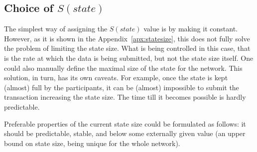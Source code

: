 \documentclass[]{llncs}   %
\begin{document}
\subsection{Choice of $S(state)$}

The simplest way of assigning the $S(state)$ value is by making it constant.
However, as it is shown in the Appendix~\ref{apx:statesize}, this does not fully solve
the problem of limiting the state size. What is being controlled in this case,
that is the rate at which the data is being submitted, but not the state size
itself. One could also manually define the maximal size of the state for the
network. This solution, in turn, has its own caveats. For example, once the
state is kept (almost) full by the participants, it can be (almost) impossible
to submit the transaction increasing the state size.  The time till it becomes
possible is hardly predictable. 

Preferable properties of the current state size could be formulated as follows:
it should be predictable, stable, and below some externally given value (an upper
bound on state size, being unique for the whole network). 
\end{document}
